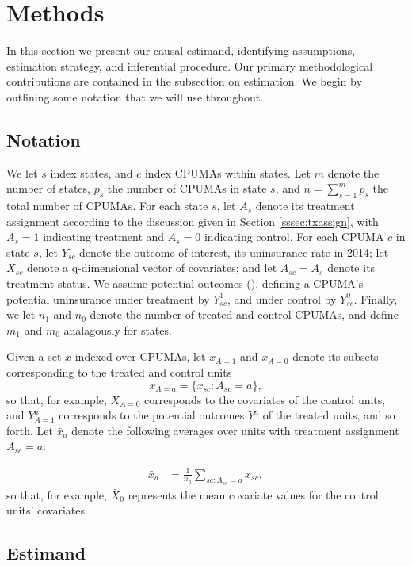 \documentclass[aoas]{imsart}
\theoremstyle{plain}
\theoremstyle{remark}
\begin{document}
\section{Methods}\label{sec:methods}

In this section we present our causal estimand, identifying assumptions, estimation strategy, and inferential procedure. Our primary methodological contributions are contained in the subsection on estimation. We begin by outlining some notation that we will use throughout.

\subsection{Notation}
We let $s$ index states, and $c$ index CPUMAs within states. Let $m$ denote the number of states, $p_s$  the number of CPUMAs in state $s$, and $n = \sum_{s=1}^m p_s$ the total number of CPUMAs. For each state $s$, let $A_s$ denote its treatment assignment according to the discussion given in Section \ref{sssec:txassign}, with $A_s = 1$ indicating treatment and $A_s=0$ indicating control. For each CPUMA $c$ in state $s$, let $Y_{sc}$ denote the outcome of interest, its uninsurance rate in 2014; let $X_{sc}$ denote a q-dimensional vector of covariates; and let $A_{sc} = A_{s}$ denote its treatment status. We assume potential outcomes (\cite{rubin2005causal}), defining a CPUMA's potential uninsurance under treatment by $Y^1_{sc}$, and under control by $Y^0_{sc}$. Finally, we let $n_1$ and $n_0$ denote the number of treated and control CPUMAs, and define $m_1$ and $m_0$ analagously for states.

Given a set $x$ indexed over CPUMAs, let $x_{A=1}$ and $x_{A=0}$ denote its subsets corresponding to the treated and control units
\[ x_{A=a} = \{x_{sc}: A_{sc}=a\},\]
so that, for example, $X_{A=0}$ corresponds to the covariates of the control units, and $Y_{A=1}^a$ corresponds to the potential outcomes $Y^a$ of the treated units, and so forth. Let $\bar{x}_a$ denote the following averages over units with treatment assignment $A_{sc} = a$:

\begin{align*}
	\bar{x}_a & = \frac{1}{n_a} \sum_{sc: A_{sc}=a} x_{sc},
\end{align*}
so that, for example, $\bar{X}_0$ represents the mean covariate values for the control units' covariates. 

\subsection{Estimand} \label{ssec:estimand}
\end{document}
